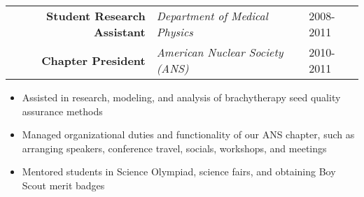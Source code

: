 
\begin{minipage}{\textwidth}
	\begin{center}
		\begin{tabular}{rll}
			\textbf{Student Research Assistant} & \textit{Department of Medical Physics} & 2008-2011 \\
			\textbf{Chapter President} & \textit{American Nuclear Society (ANS)} & 2010-2011 \\
		\end{tabular}
	\end{center}
\end{minipage}

\begin{minipage}{\textwidth}
	\begin{itemize}
		\item Assisted in research, modeling, and analysis of brachytherapy seed quality assurance methods
		\item Managed organizational duties and functionality of our ANS chapter, such as arranging speakers, conference travel, socials, workshops, and meetings
		\item Mentored students in Science Olympiad, science fairs, and obtaining Boy Scout merit badges
	\end{itemize}
\end{minipage}

